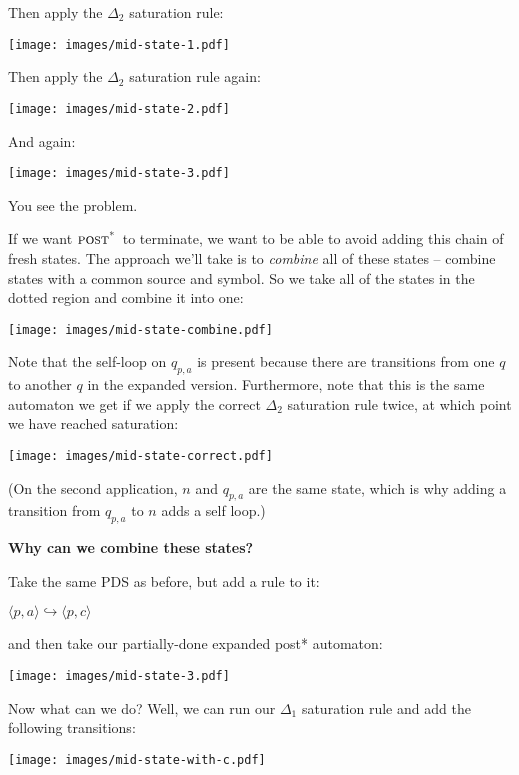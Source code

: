 \documentclass{article}
\newcommand{\Config}[2]{\ensuremath{\langle #1, #2 \rangle}}
\newcommand{\Rule}[2]{\ensuremath{#1 \hookrightarrow #2}}
\newcommand{\subsubsubsection}[1]{\textbf{#1}}
\newcommand{\poststar}{\ensuremath{\textsc{post}^\textsc{*}}}
\begin{document}
Then apply the $\Delta_2$ saturation rule:
\begin{center}
  \texttt{[image: images/mid-state-1.pdf]}
\end{center}

Then apply the $\Delta_2$ saturation rule again:
\begin{center}
  \texttt{[image: images/mid-state-2.pdf]}
\end{center}

And again:
\begin{center}
  \texttt{[image: images/mid-state-3.pdf]}
\end{center}

You see the problem.

If we want \poststar\ to terminate, we want to be able to avoid adding
this chain of fresh states. The approach we'll take is to
\emph{combine} all of these states -- combine states with a common
source and symbol. So we take all of the states in the dotted region
and combine it into one:
\begin{center}
  \texttt{[image: images/mid-state-combine.pdf]}
\end{center}


Note that the self-loop on $q_{p,a}$ is present because there are
transitions from one $q$ to another $q$ in the expanded
version. Furthermore, note that this is the same automaton we get if
we apply the correct $\Delta_2$ saturation rule twice, at which point
we have reached saturation:
\begin{center}
  \texttt{[image: images/mid-state-correct.pdf]}
\end{center}
(On the second application, $n$ and $q_{p,a}$ are the same state,
which is why adding a transition from $q_{p,a}$ to $n$ adds a self
loop.)


\subsubsubsection{Why can we combine these states?}

Take the same PDS as before, but add a rule to it:

    \Rule{\Config{p}{a}}{\Config{p}{c}}

and then take our partially-done expanded post* automaton:
\begin{center}
  \texttt{[image: images/mid-state-3.pdf]}
\end{center}

Now what can we do? Well, we can run our $\Delta_1$ saturation rule
and add the following transitions:
\begin{center}
  \texttt{[image: images/mid-state-with-c.pdf]}
\end{center}
\end{document}
